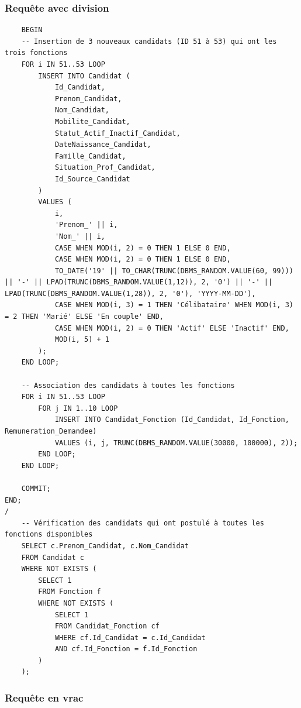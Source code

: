 \documentclass[a4paper,12pt]{article}
\begin{document}
\subsubsection*{Requête avec division}
\begin{verbatim}
    BEGIN
    -- Insertion de 3 nouveaux candidats (ID 51 à 53) qui ont les trois fonctions
    FOR i IN 51..53 LOOP
        INSERT INTO Candidat (
            Id_Candidat, 
            Prenom_Candidat, 
            Nom_Candidat, 
            Mobilite_Candidat, 
            Statut_Actif_Inactif_Candidat, 
            DateNaissance_Candidat, 
            Famille_Candidat, 
            Situation_Prof_Candidat, 
            Id_Source_Candidat
        ) 
        VALUES (
            i, 
            'Prenom_' || i, 
            'Nom_' || i, 
            CASE WHEN MOD(i, 2) = 0 THEN 1 ELSE 0 END,
            CASE WHEN MOD(i, 2) = 0 THEN 1 ELSE 0 END, 
            TO_DATE('19' || TO_CHAR(TRUNC(DBMS_RANDOM.VALUE(60, 99))) || '-' || LPAD(TRUNC(DBMS_RANDOM.VALUE(1,12)), 2, '0') || '-' || LPAD(TRUNC(DBMS_RANDOM.VALUE(1,28)), 2, '0'), 'YYYY-MM-DD'),
            CASE WHEN MOD(i, 3) = 1 THEN 'Célibataire' WHEN MOD(i, 3) = 2 THEN 'Marié' ELSE 'En couple' END,
            CASE WHEN MOD(i, 2) = 0 THEN 'Actif' ELSE 'Inactif' END,
            MOD(i, 5) + 1
        );
    END LOOP;

    -- Association des candidats à toutes les fonctions
    FOR i IN 51..53 LOOP
        FOR j IN 1..10 LOOP
            INSERT INTO Candidat_Fonction (Id_Candidat, Id_Fonction, Remuneration_Demandee)
            VALUES (i, j, TRUNC(DBMS_RANDOM.VALUE(30000, 100000), 2));
        END LOOP;
    END LOOP;

    COMMIT;
END;
/
    -- Vérification des candidats qui ont postulé à toutes les fonctions disponibles
    SELECT c.Prenom_Candidat, c.Nom_Candidat
    FROM Candidat c
    WHERE NOT EXISTS (
        SELECT 1
        FROM Fonction f
        WHERE NOT EXISTS (
            SELECT 1
            FROM Candidat_Fonction cf
            WHERE cf.Id_Candidat = c.Id_Candidat
            AND cf.Id_Fonction = f.Id_Fonction
        )
    );
\end{verbatim}
\subsubsection*{Requête en vrac}
\end{document}
